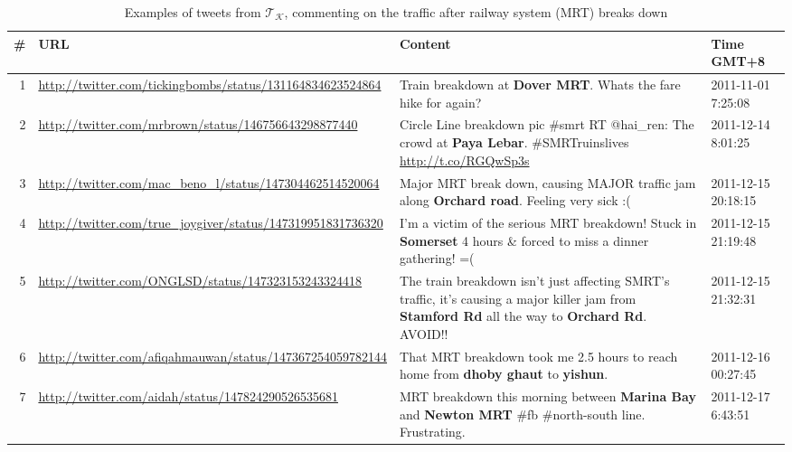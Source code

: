 \documentclass[conference]{IEEEtran.1.8}
\begin{document}
\begin{table}[htb]
	\centering
	\caption{Examples of tweets from $\mathcal{T}_{\mathcal{K}}$, commenting on the traffic after railway system (MRT) breaks down}
	\label{tbl:tweets}
	\begin{tabular}{|r|p{4cm}|p{9.5cm}|p{2.1cm}|}
		\hline
		\# & URL & Content & Time GMT+8 \\
		\hline
		1 & \url{http://twitter.com/tickingbombs/status/131164834623524864} & Train breakdown at \textbf{Dover MRT}. Whats the fare hike for again? & 2011-11-01 7:25:08  \\
		\hline
		2 & \url{http://twitter.com/mrbrown/status/146756643298877440} & Circle Line breakdown pic \#smrt RT @hai\_ren: The crowd at \textbf{Paya Lebar}. \#SMRTruinslives \url{http://t.co/RGQwSp3s} & 2011-12-14 8:01:25 \\
		\hline
		3 & \url{http://twitter.com/mac_beno_l/status/147304462514520064} & Major MRT break down, causing MAJOR traffic jam along \textbf{Orchard road}. Feeling very sick :( & 2011-12-15 20:18:15 \\
		\hline
		4 & \url{http://twitter.com/true_joygiver/status/147319951831736320} & I'm a victim of the serious MRT breakdown! Stuck in \textbf{Somerset} 4 hours \& forced to miss a dinner gathering! =( & 2011-12-15 21:19:48 \\
		\hline
		5 & \url{http://twitter.com/ONGLSD/status/147323153243324418} & The train breakdown isn't just affecting SMRT's traffic, it's causing a major killer jam from \textbf{Stamford Rd} all the way to \textbf{Orchard Rd}. AVOID!! & 2011-12-15 21:32:31 \\
		\hline
		6 & \url{http://twitter.com/afiqahmauwan/status/147367254059782144}	& That MRT breakdown took me 2.5 hours to reach home from \textbf{dhoby ghaut} to \textbf{yishun}. & 2011-12-16 00:27:45 \\
		\hline
		7 & \url{http://twitter.com/aidah/status/147824290526535681} & MRT breakdown this morning between \textbf{Marina Bay} and \textbf{Newton MRT} \#fb \#north-south line. Frustrating. & 2011-12-17 6:43:51 \\
		\hline
	\end{tabular}
\end{table}
\end{document}
